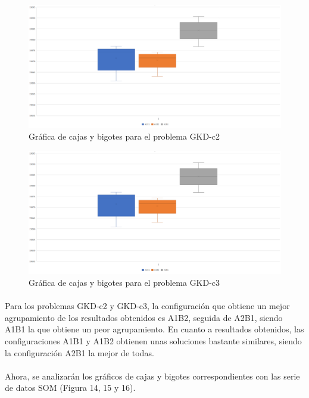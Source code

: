 	\begin{figure}[H]
		\centering
		\includegraphics[scale=0.3]{img/BIGOTESGKD2.png}
		\caption{Gráfica de cajas y bigotes para el problema GKD-c2}
		\label{gkd-c2_bigotes}
	\end{figure}

	\begin{figure}[H]
		\centering
		\includegraphics[scale=0.3]{img/BIGOTESGKD2.png}
		\caption{Gráfica de cajas y bigotes para el problema GKD-c3}
		\label{gkd-c3_bigotes}
	\end{figure}

	\paragraph{}Para los problemas GKD-c2 y GKD-c3, la configuración que obtiene un mejor agrupamiento de los resultados obtenidos es A1B2, seguida de A2B1, siendo A1B1 la que obtiene un peor agrupamiento. En cuanto a resultados obtenidos, las configuraciones A1B1 y A1B2 obtienen unas soluciones bastante similares, siendo la configuración A2B1 la mejor de todas.
	
	\paragraph{}Ahora, se analizarán los gráficos de cajas y bigotes correspondientes con las serie de datos SOM (Figura 14, 15 y 16).
	
